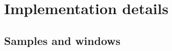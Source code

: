 \clearpage
\section{Implementation details}
\label{app:rh_impl}
\subsection{Samples and windows}
\label{sec:rh_exp_samples}
